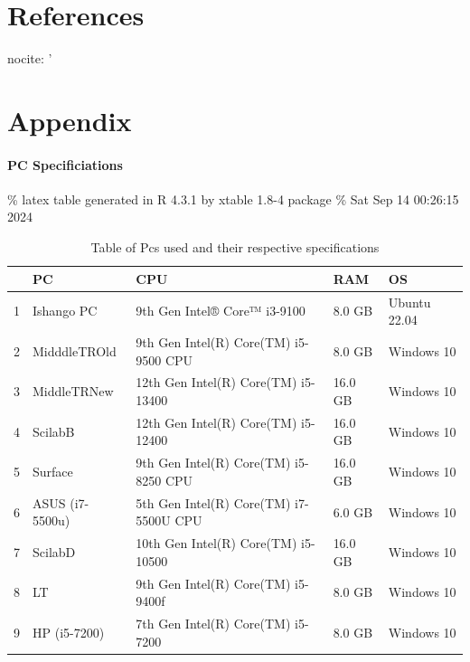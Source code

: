 \documentclass[12pt,halfline,a4paper,]{ouparticle}
\begin{document}
\hypertarget{references}{%
\section{References}\label{references}}

nocite: '

\newpage

\hypertarget{appendix}{%
\section{Appendix}\label{appendix}}

\hypertarget{pc-specificiations}{%
\paragraph{PC Specificiations}\label{pc-specificiations}}

\hfill\break
\% latex table generated in R 4.3.1 by xtable 1.8-4 package \% Sat Sep
14 00:26:15 2024

\begin{table}[ht]
\centering
\begin{tabular}{rllll}
  \hline
 & PC & CPU & RAM & OS \\ 
  \hline
1 & Ishango PC &  9th Gen Intel® Core™ i3-9100  &  8.0 GB  & Ubuntu 22.04 \\ 
  2 & MidddleTROld &  9th Gen Intel(R) Core(TM) i5-9500 CPU  &  8.0 GB  &   Windows 10 \\ 
  3 & MiddleTRNew  &  12th Gen Intel(R) Core(TM) i5-13400  &  16.0 GB  &   Windows 10 \\ 
  4 & ScilabB  &   12th Gen Intel(R) Core(TM) i5-12400  &   16.0 GB   &   Windows 10 \\ 
  5 & Surface  &   9th Gen Intel(R) Core(TM) i5-8250 CPU  &   16.0 GB   &   Windows 10 \\ 
  6 & ASUS (i7-5500u)  &   5th Gen Intel(R) Core(TM) i7-5500U CPU  &   6.0 GB   &   Windows 10 \\ 
  7 & ScilabD  &   10th Gen Intel(R) Core(TM) i5-10500  &   16.0 GB   &   Windows 10 \\ 
  8 & LT  &   9th Gen Intel(R) Core(TM) i5-9400f  &   8.0 GB   &   Windows 10 \\ 
  9 & HP (i5-7200)  &   7th Gen Intel(R) Core(TM) i5-7200  &   8.0 GB   &   Windows 10 \\ 
   \hline
\end{tabular}
\caption{Table of Pcs used and their respective specifications} 
\end{table}
\end{document}

